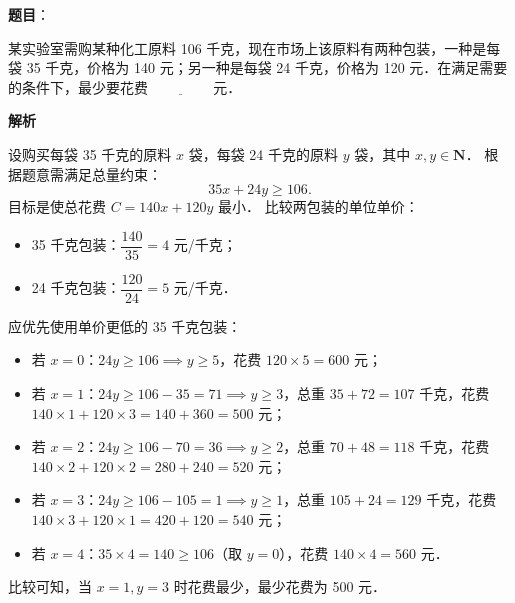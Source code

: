 \begin{answer}

\textbf{题目}：

某实验室需购某种化工原料 106 千克，现在市场上该原料有两种包装，一种是每袋 35 千克，价格为 140 元；另一种是每袋 24 千克，价格为 120 元．在满足需要的条件下，最少要花费 $\underline{\qquad\qquad}$ 元．

\textbf{解析}

设购买每袋 35 千克的原料 $x$ 袋，每袋 24 千克的原料 $y$ 袋，其中 $x, y \in \mathbf{N}$．
根据题意需满足总量约束：
\nopagebreak[4]
\[
35x + 24y \geqslant 106.
\]
目标是使总花费 $C = 140x + 120y$ 最小．
比较两包装的单位单价：
\begin{itemize}
\item 35 千克包装：$\dfrac{140}{35} = 4$ 元/千克；
\item 24 千克包装：$\dfrac{120}{24} = 5$ 元/千克．
\end{itemize}
应优先使用单价更低的 35 千克包装：
\begin{itemize}
\item 若 $x = 0$：$24y \geqslant 106 \implies y \geqslant 5$，花费 $120 \times 5 = 600$ 元；
\item 若 $x = 1$：$24y \geqslant 106 - 35 = 71 \implies y \geqslant 3$，总重 $35 + 72 = 107$ 千克，花费 $140 \times 1 + 120 \times 3 = 140 + 360 = 500$ 元；
\item 若 $x = 2$：$24y \geqslant 106 - 70 = 36 \implies y \geqslant 2$，总重 $70 + 48 = 118$ 千克，花费 $140 \times 2 + 120 \times 2 = 280 + 240 = 520$ 元；
\item 若 $x = 3$：$24y \geqslant 106 - 105 = 1 \implies y \geqslant 1$，总重 $105 + 24 = 129$ 千克，花费 $140 \times 3 + 120 \times 1 = 420 + 120 = 540$ 元；
\item 若 $x = 4$：$35 \times 4 = 140 \geqslant 106$（取 $y = 0$），花费 $140 \times 4 = 560$ 元．
\end{itemize}

比较可知，当 $x = 1, y = 3$ 时花费最少，最少花费为 500 元．


\end{answer}
